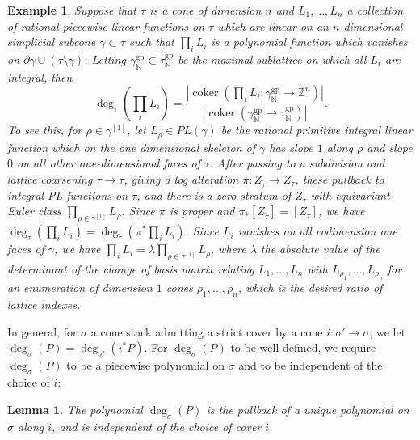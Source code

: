 \documentclass[12pt, oneside]{amsart}   	%
\newcounter{thm}
\newtheorem{example}[thm]{Example}
\newtheorem{lemma}[thm]{Lemma}
\newcommand{\NN}{\mathbb{N}}
\newcommand{\ZZ}{\mathbb{Z}}
\newcommand{\gp}{\operatorname{gp}}
\newcommand{\coker}{\operatorname{coker}}
\numberwithin{equation}{section}
\numberwithin{thm}{section}
\numberwithin{figure}{section}
\begin{document}
 \begin{example}\label{simpdeg}
Suppose that $\tau$ is a cone of dimension $n$ and $L_1,\ldots,L_n$ a collection of rational piecewise linear functions on $\tau$ which are linear on an $n$-dimensional simplicial subcone $\gamma \subset \tau$ such that $\prod_i L_i$ is a polynomial function which vanishes on $\partial \gamma \cup (\tau\setminus \gamma)$. Letting $\gamma_{\NN}^{\gp} \subset \tau_{\NN}^{\gp}$ be the maximal sublattice on which all $L_i$ are integral, then 
$$\deg_{\tau}(\prod_i L_i) = \frac{|\coker(\prod_i L_i: \gamma^{\gp}_{\NN} \rightarrow \ZZ^n)|}{|\coker(\gamma^{\gp}_{\NN} \rightarrow\tau_{\NN}^{\gp})|}.$$ 
To see this, for $\rho \in \gamma^{[1]}$, let $L_\rho \in PL(\gamma)$ be the rational primitive integral linear function which on the one dimensional skeleton of $\gamma$ has slope $1$ along $\rho$ and slope $0$ on all other one-dimensional faces of $\tau$. After passing to a subdivision and lattice coarsening $\tilde{\tau}\rightarrow \tau$, giving a log alteration $\pi: Z_{\tilde{\tau}} \rightarrow Z_{\tau}$, these pullback to integral PL functions on $\tilde{\tau}$, and there is a zero stratum of $Z_{\tilde{\tau}}$ with equivariant Euler class $\prod_{\rho\in \gamma^{[1]}} L_\rho$. Since $\pi$ is proper and $\pi_*[Z_{\tilde{\tau}}] = [Z_{\tau}]$, we have $\deg_{\tau}(\prod_i L_i) = \deg_{\tilde{\tau}}(\pi^*\prod_iL_i)$. Since $L_i$ vanishes on all codimension one faces of $\gamma$, we have $\prod_iL_i = \lambda\prod_{\rho \in \tau^{[1]}} L_{\rho}$, where $\lambda$ the absolute value of the determinant of the change of basis matrix relating $L_1,\ldots,L_n$ with $L_{\rho_1},\ldots,L_{\rho_n}$ for an enumeration of dimension $1$ cones $\rho_1,\ldots,\rho_n$, which is the desired ratio of lattice indexes. 



\end{example}

In general, for $\sigma$ a cone stack admitting a strict cover by a cone $i: \sigma' \rightarrow \sigma$, we let $\deg_{\sigma}(P) = \deg_{\sigma'}(i^*P)$. For $\deg_{\sigma}(P)$ to be well defined, we require $\deg_{\sigma}(P)$ to be a piecewise polynomial on $\sigma$ and to be independent of the choice of $i$: 

\begin{lemma}
The polynomial $\deg_{\sigma}(P)$ is the pullback of a unique polynomial on $\sigma$ along $i$, and is independent of the choice of cover $i$. 
\end{lemma}
\end{document}
